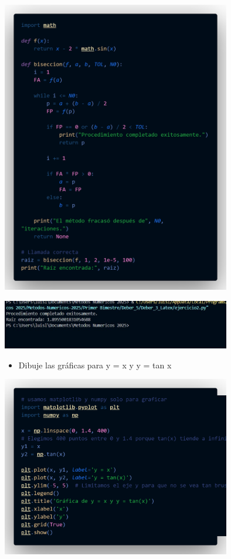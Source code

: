 \documentclass[12pt]{article}
\begin{document}
\begin{minipage}{0.75\textwidth}
    \raggedleft
    \includegraphics[width=0.75\textwidth]{inFiles/Figures/cd3.png}
\end{minipage}

\vspace{0.5cm}

\begin{minipage}{0.75\textwidth}
    \raggedleft
    \includegraphics[width=0.75\textwidth]{inFiles/Figures/ejec3.jpg}
\end{minipage}

\vspace{0.5cm}

\begin{itemize}
    \item {Dibuje las gráficas para y = x y y = tan x}
    \end{itemize}

\begin{minipage}{0.75\textwidth}
    \raggedleft
    \includegraphics[width=0.75\textwidth]{inFiles/Figures/cd4.png}
\end{minipage}
\end{document}
